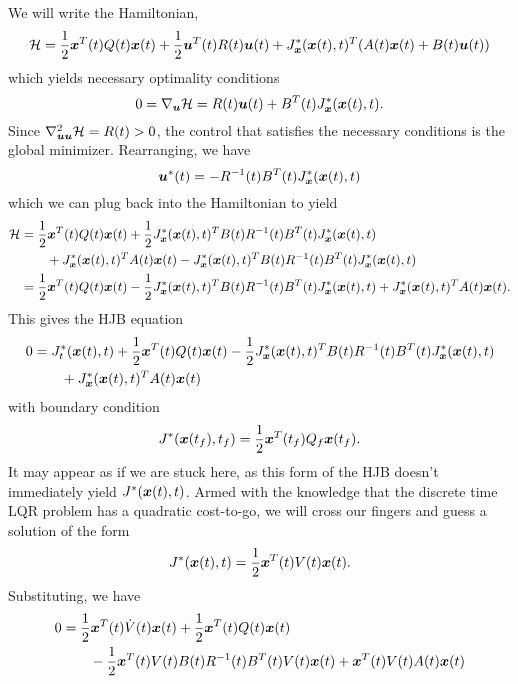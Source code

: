 We will write the Hamiltonian, 
\begin{equation}
    \mathcal{H} = \frac{1}{2} \bm{x}^T(t) Q(t) \bm{x}(t) + \frac{1}{2} \bm{u}^T(t) R(t) \bm{u}(t) + J^*_{\bm{x}}(\bm{x}(t),t)^T (A(t) \bm{x}(t) + B(t) \bm{u}(t))
\end{equation}
which yields necessary optimality conditions 
\begin{equation}
    0 = \nabla_{\bm{u}} \mathcal{H} = R(t) \bm{u}(t) + B^T(t) J^*_{\bm{x}}(\bm{x}(t),t).
\end{equation}
Since $\nabla_{\bm{u} \bm{u}}^2 \mathcal{H} = R(t) > 0$, the control that satisfies the necessary conditions is the global minimizer. Rearranging, we have
\begin{equation}
    \bm{u}^*(t) = - R^{-1}(t) B^T(t) J^*_{\bm{x}}(\bm{x}(t),t)
\end{equation}
which we can plug back into the Hamiltonian to yield
\begin{align}
    \mathcal{H} &= \frac{1}{2} \bm{x}^T(t) Q(t) \bm{x}(t) + \frac{1}{2} J^*_{\bm{x}}(\bm{x}(t),t)^T B(t) R^{-1}(t) B^T(t) J^*_{\bm{x}}(\bm{x}(t),t)\\
     &\qquad + J^*_{\bm{x}}(\bm{x}(t),t)^T A(t) \bm{x}(t) - J^*_{\bm{x}}(\bm{x}(t),t)^T B(t) R^{-1}(t) B^T(t) J^*_{\bm{x}}(\bm{x}(t),t)\nonumber\\
     &= \frac{1}{2} \bm{x}^T(t) Q(t) \bm{x}(t) - \frac{1}{2} J^*_{\bm{x}}(\bm{x}(t),t)^T B(t) R^{-1}(t) B^T(t) J^*_{\bm{x}}(\bm{x}(t),t) + J^*_{\bm{x}}(\bm{x}(t),t)^T A(t) \bm{x}(t).
\end{align}
This gives the HJB equation
\begin{align}
    0 &= J_t^*(\bm{x}(t),t) + \frac{1}{2} \bm{x}^T(t) Q(t) \bm{x}(t) - \frac{1}{2} J^*_{\bm{x}}(\bm{x}(t),t)^T B(t) R^{-1}(t) B^T(t) J^*_{\bm{x}}(\bm{x}(t),t)\\
    &\qquad + J^*_{\bm{x}}(\bm{x}(t),t)^T A(t) \bm{x}(t)\nonumber
\end{align}
with boundary condition 
\begin{equation}
    J^*(\bm{x}(t_f),t_f) = \frac{1}{2} \bm{x}^T(t_f) Q_f \bm{x}(t_f).
\end{equation}
It may appear as if we are stuck here, as this form of the HJB doesn't immediately yield $J^*(\bm{x}(t),t)$. Armed with the knowledge that the discrete time LQR problem has a quadratic cost-to-go, we will cross our fingers and guess a solution of the form
\begin{equation}
    J^*(\bm{x}(t),t) = \frac{1}{2} \bm{x}^T(t) V(t) \bm{x}(t).
\end{equation}
Substituting, we have
\begin{align}
    0 &= \frac{1}{2} \bm{x}^T(t) \dot{V}(t) \bm{x}(t) + \frac{1}{2} \bm{x}^T(t) Q(t) \bm{x}(t)\\ 
    &\qquad- \frac{1}{2} \bm{x}^T(t) V(t) B(t) R^{-1}(t) B^T(t) V(t) \bm{x}(t) + \bm{x}^T(t) V(t) A(t) \bm{x}(t)\nonumber
\end{align}
